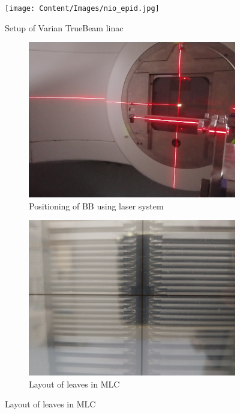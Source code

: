 \begin{figure}[H]
    \centering
    \texttt{[image: Content/Images/nio\_epid.jpg]}
    \caption{Setup of Varian TrueBeam linac}
    \label{fig:nio_epid}
\end{figure}

\begin{figure}[H]
    \centering
    \begin{subfigure}[b]{0.49\textwidth}
        \includegraphics[width=\textwidth]{Content/Images/nio_laser.jpg}
        \caption{Positioning of BB using laser system}
        \label{fig:nio_laser}
    \end{subfigure}
    \begin{subfigure}[b]{0.49\textwidth}
        \includegraphics[width=\textwidth]{Content/Images/nio_leaves.jpg}
        \caption{Layout of leaves in MLC}
        \label{fig:nio_leaves}
    \end{subfigure}
\end{figure}